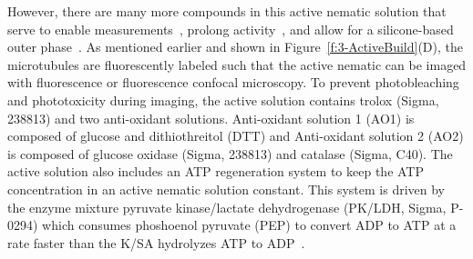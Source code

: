However, there are many more compounds in this active nematic solution that serve to enable measurements~\cite{RN3,RN135}, prolong activity~\cite{RN3,RN135}, and allow for a silicone-based outer phase~\cite{RN135}.
As mentioned earlier and shown in Figure~\ref{f:3-ActiveBuild}(D), the microtubules are fluorescently labeled such that the active nematic can be imaged with fluorescence or fluorescence confocal microscopy.
To prevent photobleaching and phototoxicity during imaging, the active solution contains trolox (Sigma, 238813) and two anti-oxidant solutions.
Anti-oxidant solution 1 (AO1) is composed of glucose and dithiothreitol (DTT) and Anti-oxidant solution 2 (AO2) is composed of glucose oxidase (Sigma, 238813) and catalase (Sigma, C40).
The active solution also includes an ATP regeneration system to keep the ATP concentration in an active nematic solution constant.
This system is driven by the enzyme mixture pyruvate kinase/lactate dehydrogenase (PK/LDH, Sigma, P-0294) which consumes phoshoenol pyruvate (PEP) to convert ADP to ATP at a rate faster than the K/SA hydrolyzes ATP to ADP~\cite{RN246}.


